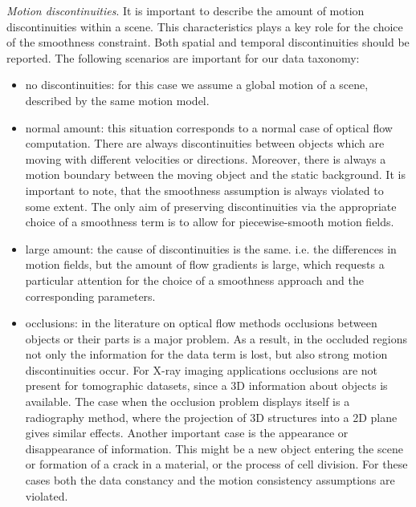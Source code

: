 \noindent \textit{Motion discontinuities}. It is important to describe the amount of motion discontinuities within a scene. This characteristics plays a key role for the choice of the smoothness constraint. Both spatial and temporal discontinuities should be reported. The following scenarios are important for our data taxonomy:
\begin{itemize}
	\item no discontinuities: for this case we assume a global motion of a scene, described by the same motion model.
	
	\item normal amount: this situation corresponds to a normal case of optical flow computation. There are always discontinuities between objects which are moving with different velocities or directions. Moreover, there is always a motion boundary between the moving object and the static background. It is important to note, that the smoothness assumption is always violated to some extent. The only aim of preserving discontinuities via the appropriate choice of a smoothness term is to allow for piecewise-smooth motion fields.
	
	\item large amount: the cause of discontinuities is the same. i.e. the differences in motion fields, but the amount of flow gradients is large, which requests a particular attention for the choice of a smoothness approach and the corresponding parameters.   
	 
	\item occlusions: in the literature on optical flow methods occlusions between objects or their parts is a major problem. As a result, in the occluded regions not only the information for the data term is lost, but also strong motion discontinuities occur. For X-ray imaging applications occlusions are not present for tomographic datasets, since a 3D information about objects is available. The case when the occlusion problem displays itself is a radiography method, where the projection of 3D structures into a 2D plane gives similar effects. Another important case is the appearance or disappearance of information. This might be a new object entering the scene or formation of a crack in a material, or the process of cell division. For these cases both the data constancy and the motion consistency assumptions are violated.              
\end{itemize}



